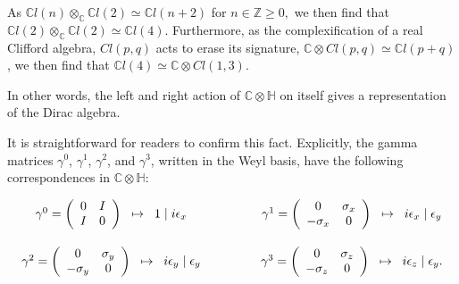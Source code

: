 \documentclass[letterpaper,12pt,titlepage,oneside,final]{book}
\newcommand{\CH}{\mathbb{C}\otimes\mathbb{H}}
\newcommand{\CLtwo}{\mathbb{C}l(2)}
\newcommand{\CLfour}{\mathbb{C}l(4)}
\begin{document}
As $\mathbb{C}l(n) \otimes_{\mathbb{C}} \CLtwo \simeq \mathbb{C}l(n+2)$ for $n\in\mathbb{Z}\geq 0,$ we then find that $\CLtwo\otimes_{\mathbb{C}}\CLtwo\simeq \CLfour$.  Furthermore, as the complexification of a real Clifford algebra, $Cl(p,q)$ acts to erase its signature, $\mathbb{C}\otimes Cl(p,q) \simeq \mathbb{C}l(p+q)$, we then find that $\CLfour\simeq \mathbb{C}\otimes Cl(1,3)$.  

In other words, the left and right action of $\CH$ on itself gives a representation of the Dirac algebra.




It is straightforward for readers to confirm this fact.  Explicitly, the gamma matrices $\gamma^0$, $\gamma^1$, $\gamma^2$, and $\gamma^3$, written in the Weyl basis, have the following correspondences in $\CH$:

\begin{equation}\begin{array}{ccc}
\gamma^0 = \left(   \begin{array}{cc} 0 & I \\ I & 0 
\end{array}\right) \hspace{2mm} \mapsto \hspace{2mm} 1\hspace{1mm} | \hspace{1mm} i{\epsilon_x}    &  \hspace{1cm} &
\gamma^1 = \left(   \begin{array}{cc} 0 & \sigma_x \\ -\sigma_x & 0 
\end{array}\right)  \hspace{2mm}\mapsto \hspace{2mm} i{\epsilon_x}\hspace{1mm} | \hspace{1mm} {\epsilon_y}   \vspace{5mm}\\

\gamma^2 = \left(   \begin{array}{cc} 0 & \sigma_y \\ -\sigma_y & 0 
\end{array}\right) \hspace{2mm} \mapsto \hspace{2mm} i{\epsilon_y}\hspace{1mm} | \hspace{1mm} {\epsilon_y}    &  \hspace{1cm} &
\gamma^3 = \left(   \begin{array}{cc} 0 & \sigma_z \\ -\sigma_z & 0 
\end{array}\right)  \hspace{2mm}\mapsto \hspace{2mm} i{\epsilon_z}\hspace{1mm} | \hspace{1mm} {\epsilon_y}. 
\end{array}\end{equation}
\end{document}

